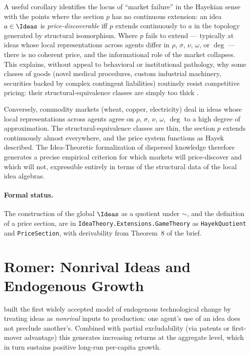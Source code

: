 A useful corollary identifies the locus of ``market failure'' in the
Hayekian sense with the points where the section $p$ has no continuous
extension: an idea $a\in\Ideas$ is \emph{price-discoverable} iff $p$
extends continuously to $a$ in the topology generated by structural
isomorphism. Where $p$ fails to extend — typically at ideas whose
local representations across agents differ in $\rho$, $\sigma$, $\nu$,
$\omega$, or $\deg$ — there is no coherent price, and the
informational role of the market collapses. This explains, without
appeal to behavioral or institutional pathology, why some classes of
goods (novel medical procedures, custom industrial machinery, securities
backed by complex contingent liabilities) routinely resist competitive
pricing: their structural-equivalence classes are simply too thick
\citep{Hayek1945}.

Conversely, commodity markets (wheat, copper, electricity) deal in
ideas whose local representations across agents agree on $\rho$,
$\sigma$, $\nu$, $\omega$, $\deg$ to a high degree of approximation.
The structural-equivalence classes are thin, the section $p$ extends
continuously almost everywhere, and the price system functions as
Hayek described. The Idea-Theoretic formalization of dispersed
knowledge therefore generates a precise empirical criterion for which
markets will price-discover and which will not, expressible entirely
in terms of the structural data of the local idea algebras.

\paragraph{Formal status.} The construction of the global $\Ideas$ as a
quotient under $\sim$, and the definition of a price section, are in
\texttt{IdeaTheory.Extensions.GameTheory} as \texttt{HayekQuotient} and
\texttt{PriceSection}, with derivability from Theorem~8 of the brief.

\section{Romer: Nonrival Ideas and Endogenous Growth}
\label{sec:romer}

\citet{Romer1990} built the first widely accepted model of endogenous
technological change by treating ideas as \emph{nonrival} inputs to
production: one agent's use of an idea does not preclude another's.
Combined with partial excludability (via patents or first-mover advantage)
this generates increasing returns at the aggregate level, which in turn
sustains positive long-run per-capita growth.

